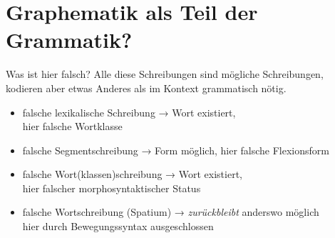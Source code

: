 \section{Graphematik als Teil der Grammatik?}

\begin{frame}
  {Was ist hier falsch?}
  \pause
  Alle diese Schreibungen sind mögliche Schreibungen,\\
  kodieren aber etwas Anderes als im Kontext grammatisch nötig.\\
  \Halbzeile
  \pause
  \begin{exe}
    \ex\label{ex:graphematikalsteildergrammatik001}
    \begin{xlist}
      \pause
      \pause
      \pause
    \end{xlist}
  \end{exe}
  \pause
  \begin{itemize}[<+->]
    \item falsche lexikalische Schreibung → Wort existiert,\\
      \alert{hier falsche Wortklasse}
    \item falsche Segmentschreibung → Form möglich, \alert{hier falsche Flexionsform}
    \item falsche Wort(klassen)schreibung → Wort existiert,\\
      \alert{hier falscher morphosyntaktischer Status}
    \item falsche Wortschreibung (Spatium) → \textit{zurückbleibt} anderswo möglich\\
      \alert{hier durch Bewegungssyntax ausgeschlossen}
  \end{itemize}
\end{frame}

